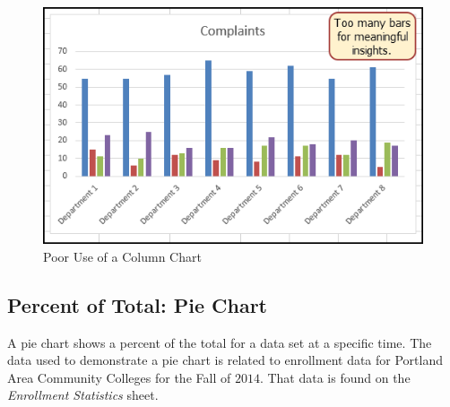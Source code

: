\begin{figure}[H]
	\centering
	\includegraphics[width=\maxwidth{.95\linewidth}]{gfx/ch04_fig20}
	\caption{Poor Use of a Column Chart}
	\label{04:fig20}
\end{figure}

\subsection{Percent of Total: Pie Chart}

A pie chart shows a percent of the total for a data set at a specific time. The data used to demonstrate a pie chart is related to enrollment data for Portland Area Community Colleges for the Fall of $ 2014 $. That data is found on the \textit{Enrollment Statistics} sheet.

